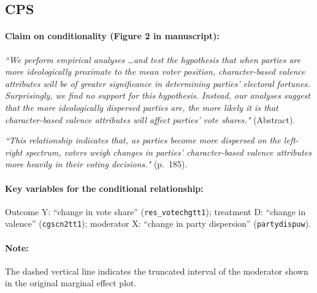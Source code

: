\documentclass[12pt]{article}
\begin{document}
\clearpage




\subsection{\citet{Clark_2014} CPS} \label{clark2}

\paragraph{Claim on conditionality (Figure 2 in manuscript):} \emph{``We perform
  empirical analyses \ldots and test the hypothesis that when parties are
  more ideologically proximate to the mean voter position,
  character-based valence attributes will be of greater significance
  in determining parties' electoral fortunes. Surprisingly, we find no
  support for this hypothesis. Instead, our analyses suggest that the more ideologically dispersed parties are, the more likely it is that character-based valence attributes will affect parties' vote shares."} (Abstract). 

\emph{``This relationship indicates that, as parties become more
  dispersed on the left-right spectrum, voters weigh changes in
  parties' character-based valence attributes more heavily in their
  voting decisions."} (p.\ 185).

\paragraph{Key variables for the conditional relationship:} Outcome Y:
``change in vote share'' (\texttt{res\_votechgtt1}); treatment D:
``change in valence''
(\texttt{cgscn2tt1}); moderator X: ``change in party dispersion'' (\texttt{partydispuw}). 

\paragraph{Note:}  The dashed vertical line indicates the truncated interval of the moderator shown in the original marginal effect plot.
\end{document}
